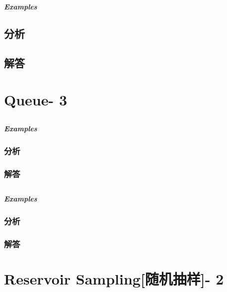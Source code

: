 \documentclass[UTF8,a4paper,12pt]{ctexbook}
\begin{document}
	\subsection{}
	
	\subparagraph{Examples}
	
	\subsection{分析}
	
	\subsection{解答}

\section{Queue- 3}
	\subsection{}
	
		\subparagraph{Examples}
		
		\subsubsection{分析}
	
		\subsubsection{解答}
	
	\subsection{}
	
		\subparagraph{Examples}
	
		\subsubsection{分析}
	
		\subsubsection{解答}

\section{Reservoir Sampling[随机抽样]- 2}
	\subsection{}
	
\end{document}
